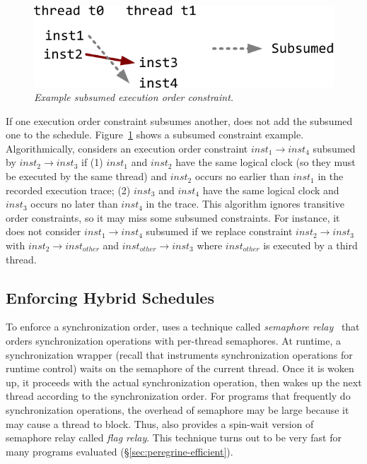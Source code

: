 \begin{figure}[t]
\centering
\includegraphics[width=.45\columnwidth]{peregrine/figures/pruned-order}
\caption{{\em Example subsumed execution order
    constraint.}} \label{fig:peregrine-subsumed}
\end{figure}

If one execution order constraint subsumes another, \peregrine does not add the
subsumed one to the schedule.  Figure~\ref{fig:peregrine-subsumed} shows a subsumed
constraint example.  Algorithmically, \peregrine considers an execution order
constraint $inst_1 \rightarrow inst_4$ subsumed by $inst_2 \rightarrow
inst_3$ if (1) $inst_1$ and $inst_2$ have the same logical clock (so they
must be executed by the same thread) and $inst_2$ occurs no earlier than
$inst_1$ in the recorded execution trace; (2) $inst_3$ and $inst_4$ have
the same logical clock and $inst_3$ occurs no later than $inst_4$ in the
trace.  This algorithm ignores
transitive order constraints, so it may miss some subsumed constraints.
For instance, it does not consider $inst_1 \rightarrow inst_4$ subsumed if
we replace constraint $inst_2 \rightarrow inst_3$ with $inst_2 \rightarrow
inst_{other}$ and $inst_{other} \rightarrow inst_3$ where $inst_{other}$
is executed by a third thread.

\subsection{Enforcing Hybrid Schedules} \label{sec:peregrine-enforce-schedule}

To enforce a synchronization order, \peregrine uses a technique called
\emph{semaphore relay}~\cite{cui:tern:osdi10} that orders synchronization
operations with per-thread semaphores.
At runtime, a synchronization wrapper
(recall that \peregrine instruments synchronization operations for runtime
control) waits on the semaphore of the current thread.  Once it is woken
up, it proceeds with the actual synchronization operation, then wakes up
the next thread according to the synchronization order.  
For programs that frequently do synchronization operations, the overhead
of semaphore may be large because it may cause a thread to block.  Thus,
\peregrine also provides a spin-wait version of
semaphore relay called \emph{flag relay}.
This technique turns out to be very
fast for many programs evaluated (\S\ref{sec:peregrine-efficient}).


